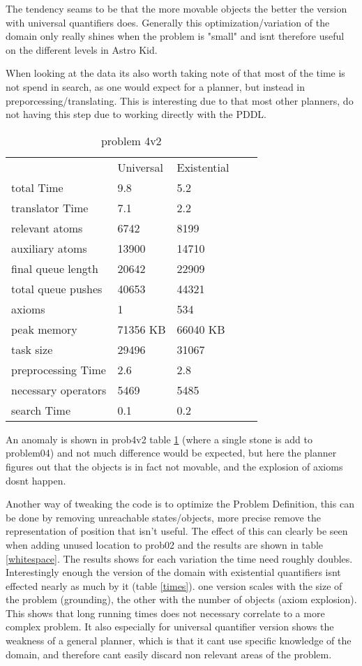 	The tendency seams to be that the more movable objects the better the version with universal quantifiers does. Generally this optimization/variation of the domain only really shines when the problem is "small" and isnt therefore useful on the different levels in Astro Kid.
	

	When looking at the data its also worth taking note of that most of the time is not spend in search, as one would expect for a planner, but instead in preporcessing/translating. This is interesting due to that most other planners, do not having this step due to working directly with the PDDL. 
	
		\begin{table}[h]
			\centering
			\caption{problem 4v2}
			\label{prob4v2}
			\begin{tabular}{lllll}
				& Universal & Existential  \\
				total Time & 9.8 & 5.2 \\
				translator Time& 7.1  & 2.2 \\
				
				
				relevant atoms & 6742 & 8199\\
				auxiliary atoms & 13900 & 14710\\
				final queue length & 20642 & 22909\\
				total queue pushes & 40653 & 44321\\
				axioms & 1 & 534 \\ 
				peak memory & 71356 KB & 66040 KB\\ 
				task size &29496 & 31067 \\
				
				
				preprocessing Time & 2.6 & 2.8 \\
				necessary operators & 5469 & 5485 \\
				
				
				search Time & 0.1 & 0.2 \\
			\end{tabular}
		\end{table}
	An anomaly is shown in prob4v2 table \ref{prob4v2} (where a single stone is add to problem04) and not much difference would be expected, but here the planner figures out that the objects is in fact not movable, and the explosion of axioms dosnt happen. 

	
	Another way of tweaking the code is to optimize the Problem Definition, this can be done by removing unreachable states/objects, more precise remove the representation of position that isn't useful. The effect of this can clearly be seen when adding unused location to prob02 and the results are shown in table \ref{whitespace}. The results shows for each variation the time need roughly doubles. Interestingly enough the version of the domain with existential quantifiers isnt effected nearly as much by it (table \ref{times}). 
	one version scales with the size of the problem (grounding), the other with the number of objects (axiom explosion). This shows that long running times does not necessary correlate to a more complex problem. It also especially for universal quantifier version shows the weakness of a general planner, which is that it cant use specific knowledge of the domain, and therefore cant easily discard non relevant areas of the problem.
	
